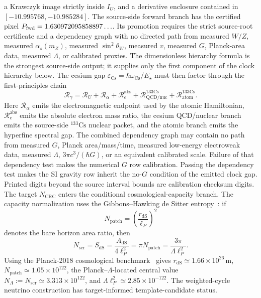 \documentclass[11pt]{article}
\begin{document}
a Krawczyk image strictly inside \(I_U\), and a derivative enclosure contained in
\([-10.995768,\allowbreak -10.985284]\). The source-side forward branch has
the certified pixel \(P_{\rm fwd}=1.630972095858897\ldots\). Its promotion
requires the strict source-root certificate and a dependency graph with no
directed path from measured \(W/Z\), measured \(\alpha_s(m_Z)\), measured
\(\sin^2\theta_W\), measured \(v\), measured \(G\), Planck-area data, measured
\(\Lambda\), or calibrated proxies. The dimensionless hierarchy formula
is the strongest source-side output; it supplies only the first
component of the clock hierarchy below. The cesium gap
\(\varepsilon_{\mathrm{Cs}}=\hbar\omega_{\mathrm{Cs}}/E_\star\) must then factor through the
first-principles chain
\[
\mathcal R_\gamma
=
\mathcal R_U
+
\mathcal R_\alpha
+
\mathcal R_e^{\mathrm{abs}}
+
\mathcal R_{\mathrm{QCD/nuc}}^{133\mathrm{Cs}}
+
\mathcal R_{\mathrm{atom}}^{133\mathrm{Cs}}.
\]
Here \(\mathcal R_\alpha\) emits the electromagnetic endpoint used by the atomic Hamiltonian,
\(\mathcal R_e^{\mathrm{abs}}\) emits the absolute electron mass ratio, the cesium
QCD/nuclear branch emits the source-side \({}^{133}\mathrm{Cs}\) nuclear packet, and the atomic
branch emits the hyperfine spectral gap. The combined dependency graph may contain no path from
measured \(G\), Planck area/mass/time, measured low-energy electroweak data, measured
\(\Lambda\), \(3\pi c^3/(\hbar G)\), or an equivalent calibrated scale. Failure of that
dependency test makes the numerical \(G\) row calibration. Passing the dependency test makes the
SI gravity row inherit the no-\(G\) condition of the emitted clock gap. Printed digits beyond the
source interval bounds are calibration checksum digits.
The target \(N_{\mathrm{CRC}}\) enters the conditional cosmological-capacity branch. The capacity normalization uses the
Gibbons--Hawking de Sitter entropy~\cite{gibbonsHawking77}: if
\[
N_{\mathrm{patch}}=\left(\frac{r_{\mathrm{dS}}}{\ell_P}\right)^2
\]
denotes the bare horizon area ratio, then
\[
N_{\mathrm{scr}}=S_{\mathrm{dS}}=\frac{A_{\mathrm{dS}}}{4\ell_P^2}
=\pi N_{\mathrm{patch}}
=\frac{3\pi}{\Lambda\ell_P^2}.
\]
Using the Planck-2018 cosmological benchmark~\cite{planck18} gives
\(r_{\mathrm{dS}}\simeq1.66\times10^{26}\,\mathrm m\),
\(N_{\mathrm{patch}}\simeq1.05\times10^{122}\),
the Planck--\(\Lambda\)-located central value
\(N_{\Lambda}:=N_{\mathrm{scr}}\simeq3.313\times10^{122}\), and
\(\Lambda\ell_P^2\simeq2.85\times10^{-122}\). The weighted-cycle neutrino
construction has target-informed template-candidate status.
\end{document}
